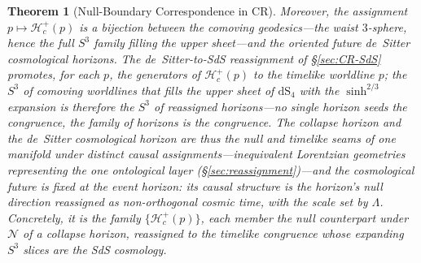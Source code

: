 \documentclass[11pt,a4paper]{article}
\theoremstyle{plain}
\newtheorem{theorem}{Theorem}
\theoremstyle{definition}
\theoremstyle{remark}
\begin{document}
\begin{theorem}[Null-Boundary Correspondence in CR]
Moreover, the assignment $p\mapsto\mathcal{H}_c^{+}(p)$ is a \emph{bijection} between the comoving geodesics---the waist $3$-sphere, hence the full $S^3$ family filling the upper sheet---and the oriented future de~Sitter cosmological horizons. The de~Sitter-to-SdS reassignment of \S\ref{sec:CR-SdS} promotes, for each $p$, the generators of $\mathcal{H}_c^{+}(p)$ to the timelike worldline $p$; the $S^3$ of comoving worldlines that fills the upper sheet of $\mathrm{dS}_4$ with the $\sinh^{2/3}$ expansion is therefore the $S^3$ of reassigned horizons---no single horizon seeds the congruence, the family of horizons \emph{is} the congruence. The collapse horizon and the de~Sitter cosmological horizon are thus the null and timelike seams of one manifold under distinct causal assignments---inequivalent Lorentzian geometries representing the one ontological layer (\S\ref{sec:reassignment})---and the cosmological future is fixed at the event horizon: its causal structure is the horizon's null direction reassigned as non-orthogonal cosmic time, with the scale set by $\Lambda$. Concretely, it is the family $\{\mathcal{H}_c^{+}(p)\}$, each member the null counterpart under $\mathcal{N}$ of a collapse horizon, reassigned to the timelike congruence whose expanding $S^3$ slices are the SdS cosmology.
\end{theorem}
\end{document}
